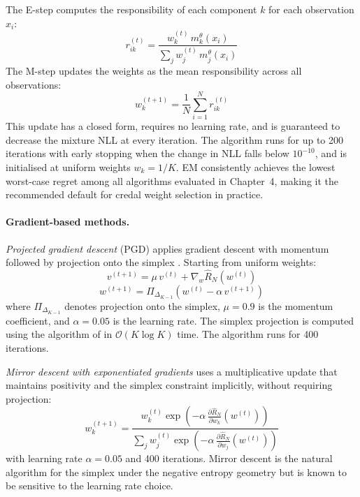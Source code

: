 The E-step computes the responsibility 
of each component $k$ for each 
observation $x_i$:
\begin{equation}
    r_{ik}^{(t)} = \frac{w_k^{(t)}\, 
    m^\theta_k(x_i)}{\sum_j w_j^{(t)}\, 
    m^\theta_j(x_i)}
    \label{eq:em_estep}
\end{equation}
The M-step updates the weights as the 
mean responsibility across all 
observations:
\begin{equation}
    w_k^{(t+1)} = \frac{1}{N} 
    \sum_{i=1}^N r_{ik}^{(t)}
    \label{eq:em_mstep}
\end{equation}
This update has a closed form, requires 
no learning rate, and is guaranteed to 
decrease the mixture NLL at every 
iteration. The algorithm runs for up 
to 200 iterations with early stopping 
when the change in NLL falls below 
$10^{-10}$, and is initialised at 
uniform weights $w_k = 1/K$. EM 
consistently achieves the lowest 
worst-case regret among all algorithms 
evaluated in Chapter~4, making it the 
recommended default for credal weight 
selection in practice.

\paragraph{Gradient-based methods.}

\textit{Projected gradient descent} 
(PGD) applies gradient descent with 
momentum followed by projection onto 
the simplex \citep{duchi2008}. 
Starting from uniform weights:
\begin{equation}
    v^{(t+1)} = \mu\, v^{(t)} + 
    \nabla_w \hat{R}_N(w^{(t)})
\end{equation}
\begin{equation}
    w^{(t+1)} = \Pi_{\Delta_{K-1}}
    \left(w^{(t)} - \alpha\, 
    v^{(t+1)}\right)
\end{equation}
where $\Pi_{\Delta_{K-1}}$ denotes 
projection onto the simplex, $\mu = 0.9$ 
is the momentum coefficient, and 
$\alpha = 0.05$ is the learning rate. 
The simplex projection is computed 
using the algorithm of \citet{duchi2008} in $\mathcal{O}(K \log K)$ time. 
The algorithm runs for 400 iterations.

\textit{Mirror descent with 
exponentiated gradients} uses a 
multiplicative update that maintains 
positivity and the simplex constraint 
implicitly, without requiring projection:
\begin{equation}
    w_k^{(t+1)} = \frac{w_k^{(t)} 
    \exp\!\left(-\alpha\, 
    \frac{\partial \hat{R}_N}
    {\partial w_k}(w^{(t)})\right)}
    {\sum_j w_j^{(t)} 
    \exp\!\left(-\alpha\, 
    \frac{\partial \hat{R}_N}
    {\partial w_j}(w^{(t)})\right)}
    \label{eq:mirror_descent}
\end{equation}
with learning rate $\alpha = 0.05$ 
and 400 iterations. Mirror descent 
is the natural algorithm for the 
simplex under the negative entropy 
geometry \citep{beck2003}
but is known to be sensitive to the 
learning rate choice.


